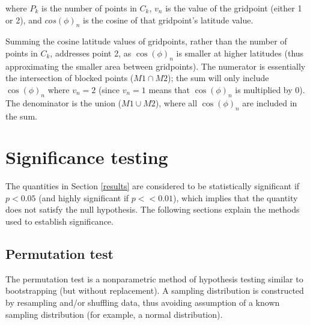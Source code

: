 \documentclass[smallextended]{svjour3}       %
\numberwithin{equation}{section}
\begin{document}
\begin{appendices}
where $P_k$ is the number of points in $C_k$, $v_n$ is the value of the gridpoint (either 1 or 2), and $cos(\phi)_n$ is the cosine of that gridpoint's latitude value. 

Summing the cosine latitude values of gridpoints, rather than the number of points in $C_k$, addresses point 2, as $\cos(\phi)_n$ is smaller at higher latitudes (thus approximating the smaller area between gridpoints). The numerator is essentially the intersection of blocked points ($M1\cap M2$); the sum will only include $\cos(\phi)_n$ where $v_n=2$ (since $v_n=1$ means that $\cos(\phi)_n$ is multiplied by 0). The denominator is the union ($M1\cup M2$), where all $\cos(\phi)_n$ are included in the sum. 

\section{Significance testing}\label{signifappendix}
The quantities in Section \ref{results} are considered to be statistically significant if $p<0.05$ (and highly significant if $p<<0.01$), which implies that the quantity does not satisfy the null hypothesis. The following sections explain the methods used to establish significance.

\subsection{Permutation test}
The permutation test is a nonparametric method of hypothesis testing similar to bootstrapping (but without replacement). A sampling distribution is constructed by resampling and/or shuffling data, thus avoiding assumption of a known sampling distribution (for example, a normal distribution). 


\end{appendices}
\end{document}

